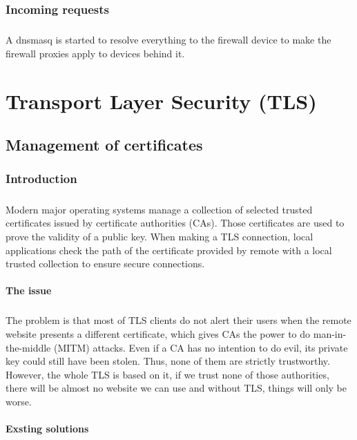 \documentclass[mscthesis]{usiinfthesis}
\begin{document}
\subsection{Incoming requests}
\paragraph{}
A dnsmasq is started to resolve everything to the firewall device to make the firewall proxies apply to devices behind it.

\chapter{Transport Layer Security (TLS)}\label{cha:tls}

\section{Management of certificates}

\subsection{Introduction}
\paragraph{}
Modern major operating systems manage a collection of selected trusted certificates issued by certificate authorities (CAs). Those certificates are used to prove the validity of a public key. When making a TLS connection, local applications check the path of the certificate provided by remote with a local trusted collection to ensure secure connections.
\subsubsection{The issue}
\paragraph{}
The problem is that most of TLS clients do not alert their users when the remote website presents a different certificate, which gives CAs the power to do man-in-the-middle (MITM) attacks. Even if a CA has no intention to do evil, its private key could still have been stolen. Thus, none of them are strictly trustworthy. However, the whole TLS is based on it, if we trust none of those authorities, there will be almost no website we can use and without TLS, things will only be worse.
\subsubsection{Exsting solutions}
\end{document}
